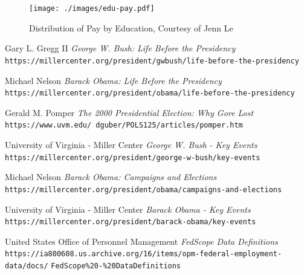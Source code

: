 \documentclass{article}
\begin{document}
\begin{center}
    \begin{figure}
        \texttt{[image: ./images/edu-pay.pdf]}
        \caption{Distribution of Pay by Education, Courtesy of Jenn Le}
        \label{edupay}
    \end{figure}
\end{center}

\newpage

\begin{thebibliography}{10}
    Gary L. Gregg II
    \textit{George W. Bush: Life Before the Presidency}
    \texttt{https://millercenter.org/president/gwbush/life-before-the-presidency}

    Michael Nelson
    \textit{Barack Obama: Life Before the Presidency}
    \texttt{https://millercenter.org/president/obama/life-before-the-presidency}

    Gerald M. Pomper
    \textit{The 2000 Presidential Election: Why Gore Lost}
    \texttt{https://www.uvm.edu/~dguber/POLS125/articles/pomper.htm}

    University of Virginia - Miller Center
    \textit{George W. Bush - Key Events}
    \texttt{https://millercenter.org/president/george-w-bush/key-events}

    Michael Nelson
    \textit{Barack Obama: Campaigns and Elections}
    \texttt{https://millercenter.org/president/obama/campaigns-and-elections}

    University of Virginia - Miller Center
    \textit{Barack Obama - Key Events}
    \texttt{https://millercenter.org/president/barack-obama/key-events}

    United States Office of Personnel Management
    \textit{FedScope Data Definitions}
    \texttt{https://ia800608.us.archive.org/16/items/opm-federal-employment-data/docs/}
    \texttt{FedScope\%20-\%20DataDefinitions}

\end{thebibliography}
\end{document}
